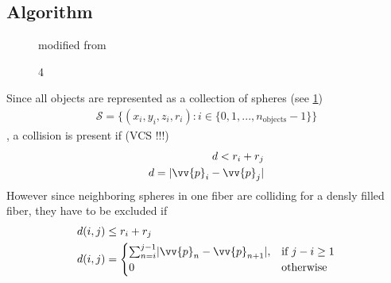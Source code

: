 \subsection{Algorithm}
% 
\begin{figure}[!tb]
\centering
{}
\caption{modified from \cite{Ginsburger2019}}
\label{fig:model:medusa_4}
\end{figure}
% 
\begin{figure}[!tb]
    \centering
	\caption{4 \cite{Ginsburger2019}}
	\label{fig:model:medusa_4_org}
\end{figure}
% 
Since all objects are represented as a collection of spheres (see \cref{fig:model:medusa_4})
\begin{align}
    \mathcal{S} = \{ (x_i,y_i,z_i,r_i) : i \in \{0, 1, ..., n_\text{objects}-1\}  \} 
\end{align}
% 
, a collision is present if (VCS !!!)
% 
\begin{align}
\begin{split}
d<r_i+r_j\\
d = \abs{\vv{p}_i - \vv{p}_j}
\end{split}
\end{align}
% 
However since neighboring spheres in one fiber are colliding for a densly filled fiber, they have to be excluded if
\begin{align}
\begin{split}
d(i,j) &\leq  r_i + r_j\\
d(i,j) &= 
\begin{cases}
\sum_{n=i}^{j-1} \abs{\vv{p}_n - \vv{p}_{n+1}},& \text{if } j-i \geq 1\\
0 & \text{otherwise}
\end{cases}
\end{split}
\end{align}
